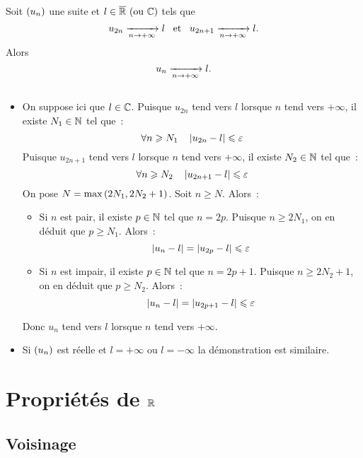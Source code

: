 \documentclass{magnolia}
\begin{document}
 \begin{proposition}[utile=-3]
 Soit $\left(u_n\right)$ une suite et $l\in\text{$\overline{\mathbb{R}}$ (ou $\mathbb{C}$)}$  tels que
 \[u_{2n}\xrightarrow[n\rightarrow +\infty]{} l \quad\!\text{et}\quad\!
   u_{2n+1}\xrightarrow[n\rightarrow +\infty]{} l.\]
 Alors
 \[u_n \xrightarrow[n\rightarrow +\infty]{} l.\]
 \end{proposition}

 \begin{preuve}
 $\quad$
 \begin{itemize}
 \item On suppose ici que $l\in\mathbb{C}$. Puisque $u_{2n}$ tend vers $l$ lorsque $n$
   tend vers $+\infty$, il existe $N_1\in\mathbb{N}$ tel que~:
   \[\forall n\geqslant N_1 \quad \left|u_{2n}-l\right|\leqslant \varepsilon\]
   Puisque $u_{2n+1}$ tend vers $l$ lorsque $n$ tend vers $+\infty$, il existe
   $N_2\in\mathbb{N}$ tel que~:
   \[\forall n\geqslant N_2 \quad \left|u_{2n+1}-l\right|\leqslant \varepsilon\]
   On pose $N=\max\left(2N_1,2N_2+1\right)$. Soit $n\geq N$. Alors~:
   \begin{itemize}
   \item Si $n$ est pair, il existe $p\in\mathbb{N}$ tel que $n=2p$. Puisque
     $n\geq 2N_1$, on en déduit que $p\geq N_1$. Alors~:
     \[\left|u_n-l\right|=\left|u_{2p}-l\right| \leqslant \varepsilon\]
   \item Si $n$ est impair, il existe $p\in\mathbb{N}$ tel que $n=2p+1$. Puisque
     $n\geq 2N_2+1$, on en déduit que $p\geq N_2$. Alors~:
     \[\left|u_n-l\right|=\left|u_{2p+1}-l\right| \leqslant \varepsilon\]
   \end{itemize}
   Donc $u_n$ tend vers $l$ lorsque $n$ tend vers $+\infty$.
 \item Si $\left(u_n\right)$ est réelle et $l=+\infty$ ou $l=-\infty$ la démonstration
   est similaire.
 \end{itemize}
 \end{preuve}




\section{Propriétés de $\mathbb{R}$}

\subsection{Voisinage}
\end{document}
